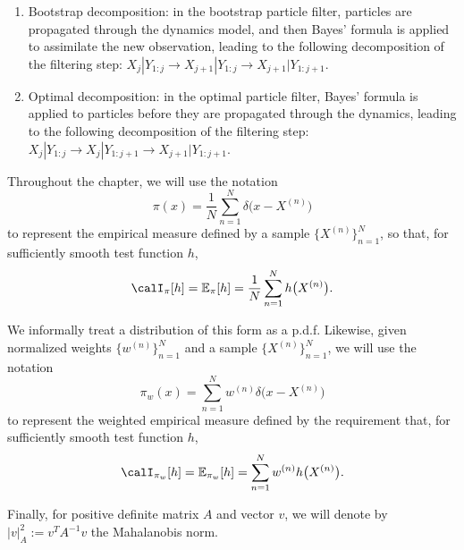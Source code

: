 \begin{enumerate}
  \item Bootstrap decomposition: in the bootstrap particle filter, particles are propagated
    through the dynamics model, and then Bayes' formula is applied to assimilate the new
    observation, leading to the following decomposition of the filtering step:
    $X_j | Y_{1:j} \longrightarrow X_{j+1} | Y_{1:j} \longrightarrow X_{j+1} | Y_{1:j+1}$.

  \item Optimal decomposition: in the optimal particle filter, Bayes' formula is applied
    to particles before they are propagated through the dynamics, leading to the following
    decomposition of the filtering step:
    $X_j | Y_{1:j} \longrightarrow X_j | Y_{1:j+1} \longrightarrow X_{j+1} | Y_{1:j+1}$.
\end{enumerate}

Throughout the chapter, we will use the notation
\[
  \pi(x) = \frac{1}{N} \sum_{n=1}^{N} \delta\bigl(x - X^{(n)}\bigr)
\]
to represent the empirical measure defined by a sample $\{X^{(n)}\}_{n=1}^{N}$, so that,
for sufficiently smooth test function $h$,
\[
  \calI_\pi[h] = \mathbb{E}_\pi[h] = \frac{1}{N} \sum_{n=1}^{N} h\bigl(X^{(n)}\bigr).
\]

We informally treat a distribution of this form as a p.d.f. Likewise, given normalized
weights $\{w^{(n)}\}_{n=1}^{N}$ and a sample $\{X^{(n)}\}_{n=1}^{N}$, we will use the
notation
\[
  \pi_w(x) = \sum_{n=1}^{N} w^{(n)} \delta\bigl(x - X^{(n)}\bigr)
\]
to represent the weighted empirical measure defined by the requirement that, for
sufficiently smooth test function $h$,
\[
  \calI_{\pi_w}[h] = \mathbb{E}_{\pi_w}[h] = \sum_{n=1}^{N} w^{(n)} h\bigl(X^{(n)}\bigr).
\]

Finally, for positive definite matrix $A$ and vector $v$, we will denote by
$|v|_A^2 := v^T A^{-1} v$ the Mahalanobis norm.
